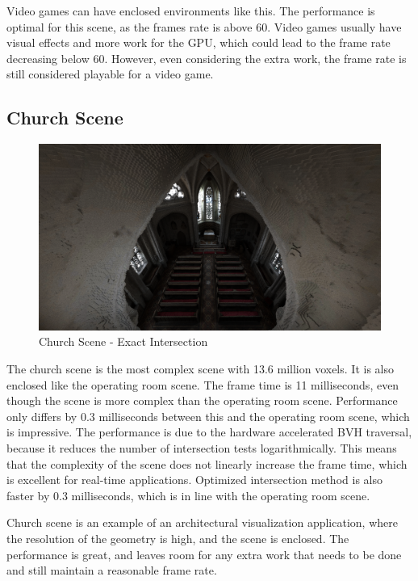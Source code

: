 \documentclass[12pt]{article}
\begin{document}
Video games can have enclosed environments like this. The performance is optimal for this scene,
as the frames rate is above 60. Video games usually have visual effects and more work for the GPU,
which could lead to the frame rate decreasing below 60. However, even considering the extra work,
the frame rate is still considered playable for a video game.

\subsection{Church Scene}

\begin{figure}[H]
    \begin{center}
        \includegraphics[scale=0.25]{Church}
    \end{center}
    \caption{Church Scene - Exact Intersection}
    \label{fig:Church}
\end{figure}

The church scene is the most complex scene with 13.6 million voxels. It is also enclosed like the operating room scene.
The frame time is 11 milliseconds, even though the scene is more complex than the operating room scene.
Performance only differs by 0.3 milliseconds between this and the operating room scene, which is impressive.
The performance is due to the hardware accelerated BVH traversal, because it reduces the number of intersection tests logarithmically.
This means that the complexity of the scene does not linearly increase the frame time, which is excellent for real-time applications.
Optimized intersection method is also faster by 0.3 milliseconds, which is in line with the operating room scene.

Church scene is an example of an architectural visualization application, where the resolution of the geometry is high,
and the scene is enclosed. The performance is great, and leaves room for any extra work that needs to be done and still maintain a reasonable frame rate.
\end{document}
